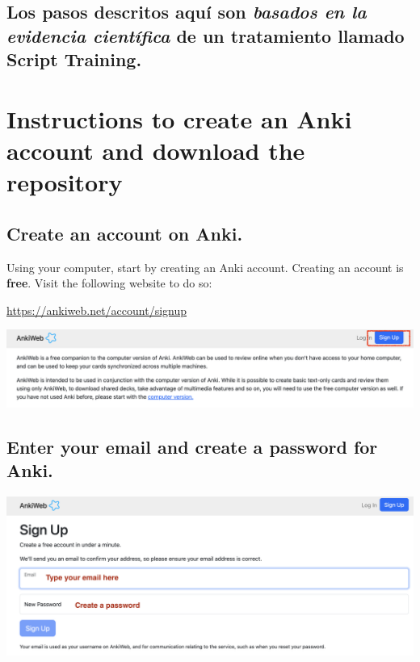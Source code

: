 \documentclass[
]{book}
\begin{document}
\hypertarget{los-pasos-descritos-aquuxed-son-basados-en-la-evidencia-cientuxedfica-de-un-tratamiento-llamado-script-training.}{%
\section{\texorpdfstring{Los pasos descritos aquí son \emph{basados en la evidencia científica} de un tratamiento llamado Script Training.}{Los pasos descritos aquí son basados en la evidencia científica de un tratamiento llamado Script Training.}}\label{los-pasos-descritos-aquuxed-son-basados-en-la-evidencia-cientuxedfica-de-un-tratamiento-llamado-script-training.}}

\hypertarget{cross_3}{%
\chapter{Instructions to create an Anki account and download the repository}\label{cross_3}}

\hypertarget{create-an-account-on-anki.}{%
\section{Create an account on Anki.}\label{create-an-account-on-anki.}}

Using your computer, start by creating an Anki account. Creating an account is \textbf{free}. Visit the following website to do so:

\url{https://ankiweb.net/account/signup}

\includegraphics[width=1\linewidth]{images/reposit_en/sign_up}

\hypertarget{cross_3}{%
\section{Enter your email and create a password for Anki.}\label{cross_3}}

\includegraphics[width=1\linewidth]{images/reposit_en/email_password}
\end{document}
